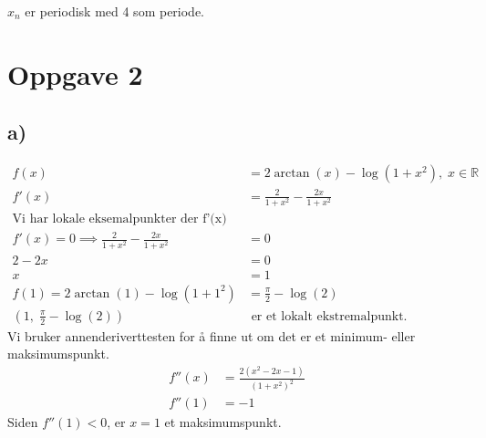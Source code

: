 \documentclass{article}
\begin{document}
$x_n$ er periodisk med 4 som periode.
\section*{Oppgave 2}
\subsection*{a)}
\begin{align*}
	f(x)&= 2 \arctan (x) - \log(1+x^2),\; x \in \mathbb{R}\\
	f'(x)&= \frac{2}{1+x^2} - \frac{2x}{1+x^2}\\
	\text{Vi har lokale eksemalpunkter der f'(x) = 0}\\
	f'(x) = 0 \implies \frac{2}{1+x^2} - \frac{2x}{1+x^2} &= 0\\
	2 - 2x &= 0\\
	x &= 1\\
	f(1) = 2 \arctan (1) - \log(1 + 1^2) &= \frac{\pi}{2} - \log(2)\\
	\left(1,\;\frac{\pi}{2} - \log(2)\right) & \text{ er et lokalt ekstremalpunkt.}
\end{align*}
Vi bruker annenderiverttesten for å finne ut om det er et minimum- eller maksimumspunkt.
\begin{align*}
f''(x) &= \frac{2(x^2-2x-1)}{(1+x^2)^2}\\
f''(1) &= -1
\end{align*}
Siden $f''(1) < 0$, er $x=1$ et maksimumspunkt.
\end{document}
